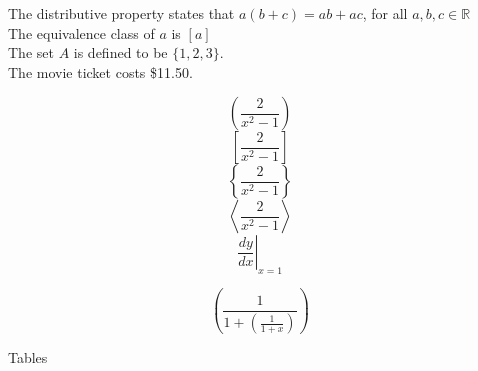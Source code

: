 \documentclass[12pt]{article}
\begin{document}
The distributive property states that $a(b+c)=ab+ac$, for all $a, b, c \in \mathbb{R}$
\\[6pt]
The equivalence class of $a$ is $[a]$ 
\\[6pt]
The set $A$ is defined to be $\{1,2,3\}$.
\\[6pt]
The movie ticket costs \$11.50.

\begin{equation}
    \left( \frac{2}{x^2-1} \right) 
\end{equation}
\begin{equation}
    \left[ \frac{2}{x^2-1} \right] 
\end{equation}
\begin{equation}
    \left\{ \frac{2}{x^2-1} \right\} 
\end{equation}
\begin{equation}
    \left\langle \frac{2}{x^2-1} \right\rangle 
\end{equation}
\begin{equation}
    \left. \frac{dy}{dx} \right|_{x = 1}
\end{equation}

\begin{equation}
    \left( \frac{1}{ 1+\left( \frac{1}{1+x}\right) } \right)
\end{equation}

Tables
\\[6pt]


 
\end{document}
